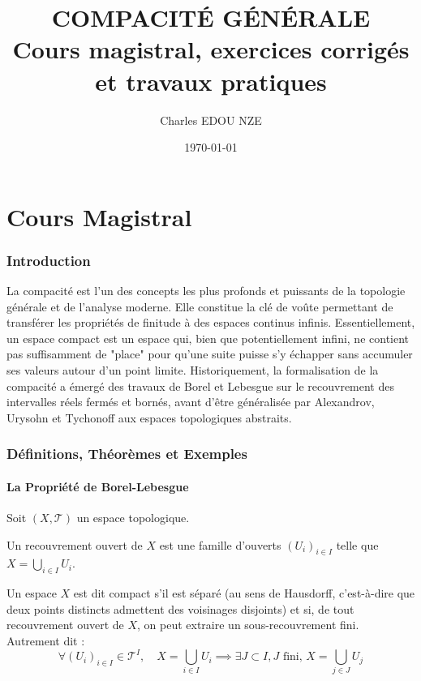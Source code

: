 \documentclass[11pt,a4paper]{article}
\title{\Huge COMPACITÉ GÉNÉRALE \\ \large Cours magistral, exercices corrigés et travaux pratiques}
\author{\Large Charles EDOU NZE}
\date{\today}
\begin{document}
\maketitle
\tableofcontents
\newpage

\part{Cours Magistral}


\section{Introduction}

La compacité est l'un des concepts les plus profonds et puissants de la topologie générale et de l'analyse moderne. Elle constitue la clé de voûte permettant de transférer les propriétés de finitude à des espaces continus infinis. Essentiellement, un espace compact est un espace qui, bien que potentiellement infini, ne contient pas suffisamment de "place" pour qu'une suite puisse s'y échapper sans accumuler ses valeurs autour d'un point limite. Historiquement, la formalisation de la compacité a émergé des travaux de Borel et Lebesgue sur le recouvrement des intervalles réels fermés et bornés, avant d'être généralisée par Alexandrov, Urysohn et Tychonoff aux espaces topologiques abstraits.

\section{Définitions, Théorèmes et Exemples}

\subsection{La Propriété de Borel-Lebesgue}

Soit $(X, \mathcal{T})$ un espace topologique.

Un recouvrement ouvert de $X$ est une famille d'ouverts $(U_i)_{i \in I}$ telle que $X = \bigcup_{i \in I} U_i$.

Un espace $X$ est dit compact s'il est séparé (au sens de Hausdorff, c'est-à-dire que deux points distincts admettent des voisinages disjoints) et si, de tout recouvrement ouvert de $X$, on peut extraire un sous-recouvrement fini. Autrement dit :
$$ \forall (U_i)_{i \in I} \in \mathcal{T}^I, \quad X = \bigcup_{i \in I} U_i \implies \exists J \subset I, J \text{ fini, } X = \bigcup_{j \in J} U_j $$
\end{document}
